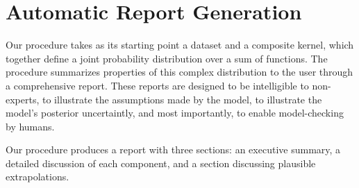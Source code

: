 \documentclass{article} %
\begin{document}
\section{Automatic Report Generation}
\label{sec:method}

Our procedure takes as its starting point a dataset and a composite kernel, which together define a joint probability distribution over a sum of functions.  The procedure summarizes properties of this complex distribution to the user through a comprehensive report.
%
These reports are designed to be intelligible to non-experts, to illustrate the assumptions made by the model, to illustrate the model's posterior uncertaintly, and most importantly, to enable model-checking by humans.





Our procedure produces a report with three sections: an executive summary, a detailed discussion of each component, and a section discussing plausible extrapolations.
\end{document}
